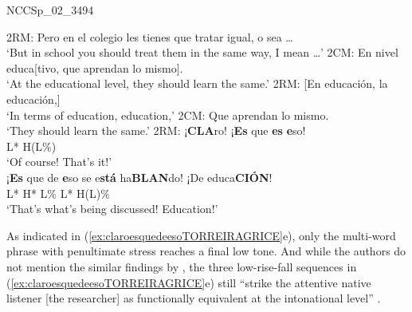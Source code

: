 \begin{exe}
\ex\label{ex:claroesquedeesoTORREIRAGRICE} NCCSp\_02\_3494
\begin{xlist}
	\ex
	2RM: Pero en el colegio les tienes que tratar igual, o sea \ldots\\
	\hspace*{2em} `But in school you should treat them in the same way, I mean \ldots'
	\ex
	2CM: En nivel educa[tivo, que aprendan lo mismo].\\
	\hspace*{2em} `At the educational level, they should learn the same.'
	\ex
	2RM: \hspace{7em}[En educación, la educación,]\\
	\hspace*{9em} `In terms of education, education,'
	\ex
	2CM: Que aprendan lo mismo.\\
	\hspace*{2em} `They should learn the same.'
	\ex
	2RM: ¡\textbf{CLA}ro! \hspace{2em} ¡\textbf{Es} que \textbf{es} \textbf{e}so! \\
	\hspace*{3em} L* H(L\%) \\
	\hspace*{2em} `Of course! \hspace{1.5em} That's it!'\\
	\hspace*{2em} ¡\textbf{Es} que de \textbf{e}so se e\textbf{stá} ha\textbf{BLAN}do! ¡De educa\textbf{CIÓN}! \\
	\hspace*{2em} L* \hspace*{9.6em} H* L\% \hspace{4em} L* H(L)\% \\
	\hspace*{2em} `That's what's being discussed! \hspace{2.5em} Education!'
\end{xlist}
\end{exe}

As indicated in (\ref{ex:claroesquedeesoTORREIRAGRICE}e), only the multi-word phrase with penultimate stress rea\-ches a final low tone. And while the authors do not mention the similar findings by \citet{ElviraGarcia.2016}, the three low-rise-fall sequences in (\ref{ex:claroesquedeesoTORREIRAGRICE}e) still ``strike the attentive native listener [the researcher] as functionally equivalent at the intonational level'' \citep[16]{TorreiraGrice.2018}.

